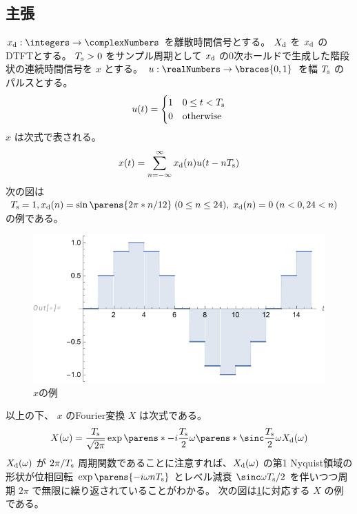         \subsection{主張}
            $\xd:\integers\to\complexNumbers$ を離散時間信号とする。
            $X_\text{d}$ を $x_\text{d}$ のDTFTとする。
            $T_\text{s}>0$ をサンプル周期として $x_\text{d}$ の0次ホールドで生成した階段状の連続時間信号を $x$ とする。
            $u:\realNumbers\to\braces{0,1}$ を幅 $T_\text{s}$ のパルスとする。
            \[
                u(t) = \begin{cases}
                    1 & 0\leq t < T_\text{s} \\
                    0 & \text{otherwise}
                \end{cases}
            \]
            $x$ は次式で表される。
            \[ x(t) = \sum_{n=-\infty}^\infty x_\text{d}(n)u(t-nT_\text{s}) \]
            次の図は $\Ts=1,\xd(n) = \sin\parens{2\pi*n/12}\;(0\leq n\leq 24),\;\xd(n) = 0\;(n<0,24<n)$ の例である。
            \begin{figure}[H]
                \centering
                \includegraphics[keepaspectratio, scale=0.8]
                {parts/time-discretization/chapters/up-sampling/imgs/x1.pdf}
                \caption{$x$の例}
                \label{離散時間信号のDAC出力の例}
            \end{figure}
            以上の下、 $x$ のFourier変換 $X$ は次式である。
            \[ X(\omega) = \frac{\Ts}{\sqrt{2\pi}}\exp\parens*{-i\frac{\Ts}{2}\omega}\parens*{\sinc \frac{\Ts}{2}\omega}\Xd(\omega) \]
            $X_\text{d}(\omega)$ が $2\pi/T_\text{s}$ 周期関数であることに注意すれば、$X_\text{d}(\omega)$ の第1 Nyquist領域の形状が位相回転 $\exp\parens{-i \omega n\Ts}$ とレベル減衰 $\sinc\omega\Ts/2$ を伴いつつ周期 $2\pi$ で無限に繰り返されていることがわかる。
            次の図は\ref{離散時間信号のDAC出力の例}に対応する $X$ の例である。
